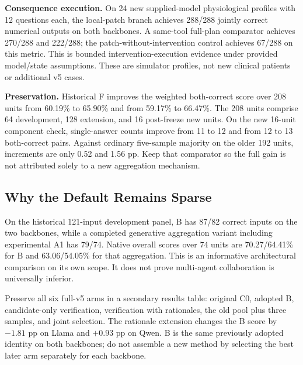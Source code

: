 \documentclass[11pt,a4paper]{article}
\begin{document}
\textbf{Consequence execution.} On 24 new supplied-model physiological profiles with 12 questions each, the local-patch branch achieves 288/288 jointly correct numerical outputs on both backbones. A same-tool full-plan comparator achieves 270/288 and 222/288; the patch-without-intervention control achieves 67/288 on this metric. This is bounded intervention-execution evidence under provided model/state assumptions. These are simulator profiles, not new clinical patients or additional v5 cases.

\textbf{Preservation.} Historical F improves the weighted both-correct score over 208 units from 60.19\% to 65.90\% and from 59.17\% to 66.47\%. The 208 units comprise 64 development, 128 extension, and 16 post-freeze new units. On the new 16-unit component check, single-answer counts improve from 11 to 12 and from 12 to 13 both-correct pairs. Against ordinary five-sample majority on the older 192 units, increments are only 0.52 and 1.56 pp. Keep that comparator so the full gain is not attributed solely to a new aggregation mechanism.

\subsection{Why the Default Remains Sparse}
On the historical 121-input development panel, B has 87/82 correct inputs on the two backbones, while a completed generative aggregation variant including experimental A1 has 79/74. Native overall scores over 74 units are 70.27/64.41\% for B and 63.06/54.05\% for that aggregation. This is an informative architectural comparison on its own scope. It does not prove multi-agent collaboration is universally inferior.

Preserve all six full-v5 arms in a secondary results table: original C0, adopted B, candidate-only verification, verification with rationales, the old pool plus three samples, and joint selection. The rationale extension changes the B score by $-1.81$ pp on Llama and $+0.93$ pp on Qwen. B is the same previously adopted identity on both backbones; do not assemble a new method by selecting the best later arm separately for each backbone.
\end{document}
